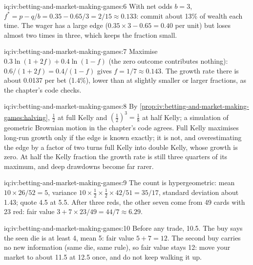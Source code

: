 \begin{solution}{iq:iv:betting-and-market-making-games:6}
With net odds $b = 3$, $f^\ast = p - q/b = 0.35 - 0.65/3 = 2/15 \approx 0.133$: commit about 13\% of wealth each time. The
wager has a large edge ($0.35 \times 3 - 0.65 = 0.40$ per unit) but loses almost two times in three, which keeps the
fraction small.
\end{solution}

\begin{solution}{iq:iv:betting-and-market-making-games:7}
Maximise $0.3\ln(1 + 2f) + 0.4\ln(1 - f)$ (the zero outcome contributes nothing): $0.6/(1 + 2f) = 0.4/(1 - f)$ gives
$f = 1/7 \approx 0.143$. The growth rate there is about 0.0137 per bet (1.4\%), lower than at slightly smaller or
larger fractions, as the chapter's code checks.
\end{solution}

\begin{solution}{iq:iv:betting-and-market-making-games:8}
By \cref{prop:iv:betting-and-market-making-games:halving}, $\tfrac12$ at full Kelly and $(\tfrac12)^3 = \tfrac18$ at half
Kelly; a simulation of geometric Brownian motion in the chapter's code agrees. Full Kelly maximises long-run growth
only if the edge is known exactly; it is not, and overestimating the edge by a factor of two turns full Kelly into
double Kelly, whose growth is zero. At half the Kelly fraction the growth rate is still three quarters of its maximum, and deep drawdowns become far
rarer.
\end{solution}

\begin{solution}{iq:iv:betting-and-market-making-games:9}
The count is hypergeometric: mean $10 \times 26/52 = 5$, variance $10 \times \tfrac12 \times \tfrac12 \times 42/51
= 35/17$, standard deviation about 1.43; quote 4.5 at 5.5. After three reds, the other seven come from 49 cards
with 23 red: fair value $3 + 7 \times 23/49 = 44/7 \approx 6.29$.
\end{solution}

\begin{solution}{iq:iv:betting-and-market-making-games:10}
Before any trade, 10.5. The buy says the seen die is at least 4, mean 5: fair value $5 + 7 = 12$. The second buy
carries no new information (same die, same rule), so fair value stays 12: move your market to about 11.5 at 12.5 once,
and do not keep walking it up.
\end{solution}

